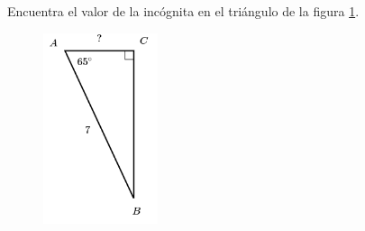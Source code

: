 Encuentra el valor de la incógnita en el triángulo de la figura \ref{fig:lados_functrig_12}.
\begin{figure}[H]
    \begin{center}
        \includegraphics[width=0.3\textwidth]{../images/lados_functrig_12.png}
    \end{center}
    \caption{}
    \label{fig:lados_functrig_12}
\end{figure}